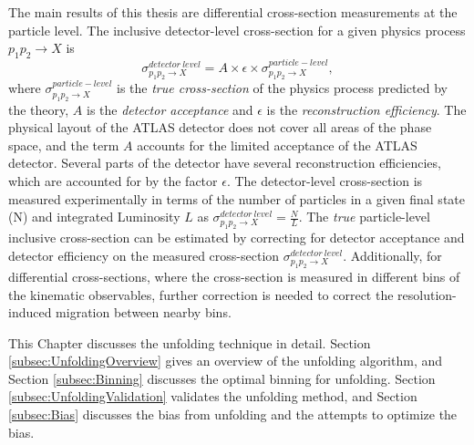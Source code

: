 The main results of this thesis are differential cross-section measurements at the particle level. The inclusive detector-level cross-section for a given physics process $p_{1}p_{2}\rightarrow X$ is
\begin{equation}
    \sigma ^{detector~level}_{p_{1}p_{2}\rightarrow X} = A \times \epsilon \times \sigma ^{particle-level}_{p_{1}p_{2}\rightarrow X},
    \label{eqn:InclusiveXS}
\end{equation}
where $\sigma ^{particle-level}_{p_{1}p_{2}\rightarrow X}$ is the \textit{true cross-section} of the physics process predicted by the theory, $A$ is the \textit{detector acceptance} and $\epsilon$ is the \textit{reconstruction efficiency}. The physical layout of the ATLAS detector does not cover all areas of the phase space, and the term $A$ accounts for the limited acceptance of the ATLAS detector. Several parts of the detector have several reconstruction efficiencies, which are accounted for by the factor $\epsilon$. The detector-level cross-section is measured experimentally in terms of the number of particles in a given final state (N) and integrated Luminosity $L$ as $\sigma ^{detector~level}_{p_{1}p_{2}\rightarrow X} = \frac{N}{L}$. The \textit{true} particle-level inclusive cross-section can be estimated by correcting for detector acceptance and detector efficiency on the measured cross-section $\sigma ^{detector~level}_{p_{1}p_{2}\rightarrow X}$. Additionally, for differential cross-sections, where the cross-section is measured in different bins of the kinematic observables, further correction is needed to correct the resolution-induced migration between nearby bins. 

This Chapter discusses the unfolding technique in detail. Section \ref{subsec:UnfoldingOverview} gives an overview of the unfolding algorithm, and Section \ref{subsec:Binning} discusses the optimal binning for unfolding. Section \ref{subsec:UnfoldingValidation} validates the unfolding method, and Section \ref{subsec:Bias} discusses the bias from unfolding and the attempts to optimize the bias. 


